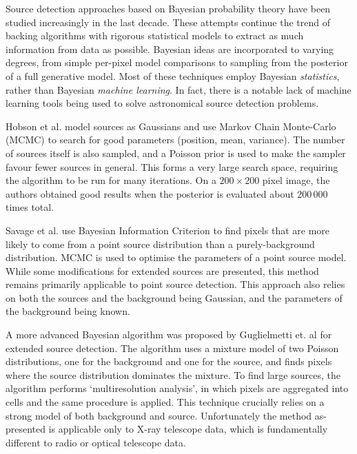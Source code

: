 Source detection approaches based on Bayesian probability theory have been studied increasingly in the last decade. These attempts continue the trend of backing algorithms with rigorous statistical models to extract as much information from data as possible. Bayesian ideas are incorporated to varying degrees, from simple per-pixel model comparisons to sampling from the posterior of a full generative model. Most of these techniques employ Bayesian \emph{statistics}, rather than Bayesian \emph{machine learning}. In fact, there is a notable lack of machine learning tools being used to solve astronomical source detection problems.

Hobson et al. \cite{hobson2003bayesian} model sources as Gaussians and use Markov Chain Monte-Carlo (MCMC) to search for good parameters (position, mean, variance). The number of sources itself is also sampled, and a Poisson prior is used to make the sampler favour fewer sources in general. This forms a very large search space, requiring the algorithm to be run for many iterations. On a $200 \times 200$ pixel image, the authors obtained good results when the posterior is evaluated about 200\,000 times total.

Savage et al. \cite{savage2007bayesian} use Bayesian Information Criterion to find pixels that are more likely to come from a point source distribution than a purely-background distribution. MCMC is used to optimise the parameters of a point source model. While some modifications for extended sources are presented, this method remains primarily applicable to point source detection. This approach also relies on both the sources and the background being Gaussian, and the parameters of the background being known.

A more advanced Bayesian algorithm was proposed by Guglielmetti et. al \cite{guglielmetti2009background} for extended source detection. The algorithm uses a mixture model of two Poisson distributions, one for the background and one for the source, and finds pixels where the source distribution dominates the mixture. To find large sources, the algorithm performs `multiresolution analysis', in which pixels are aggregated into cells and the same procedure is applied. This technique crucially relies on a strong model of both background and source. Unfortunately the method as-presented is applicable only to X-ray telescope data, which is fundamentally different to radio or optical telescope data.

